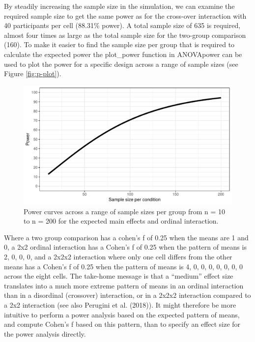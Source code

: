 \documentclass[,jou,floatsintext]{apa6}
\begin{document}
By steadily increasing the sample size in the simulation, we can examine the required sample size to get the same power as for the cross-over interaction with 40 participants per cell (88.31\% power). A total sample size of 635 is required, almost four times as large as the total sample size for the two-group comparison (160). To make it easier to find the sample size per group that is required to calculate the expected power the plot\_power function in ANOVApower can be used to plot the power for a specific design across a range of sample sizes (see Figure \ref{fig:p-plot}).

\begin{figure}
\centering
\includegraphics{0.1_Simulation_Based_Power_Analysis_For_Factorial_ANOVA_Designs_files/figure-latex/power-plot-1.pdf}
\caption{\label{fig:power-plot}Power curves across a range of sample sizes per group from n = 10 to n = 200 for the expected main effects and ordinal interaction.}
\end{figure}

Where a two group comparison has a cohen's f of 0.25 when the means are 1 and 0, a 2x2 ordinal interaction has a Cohen's f of 0.25 when the pattern of means is 2, 0, 0, 0, and a 2x2x2 interaction where only one cell differs from the other means has a Cohen's f of 0.25 when the pattern of means is 4, 0, 0, 0, 0, 0, 0, 0 across the eight cells.
The take-home message is that a \enquote{medium} effect size translates into a much more extreme pattern of means in an ordinal interaction than in a disordinal (crossover) interaction, or in a 2x2x2 interaction compared to a 2x2 interaction (see also Perugini et al. (2018)).
It might therefore be more intuitive to perform a power analysis based on the expected pattern of means, and compute Cohen's f based on this pattern, than to specify an effect size for the power analysis directly.
\end{document}
